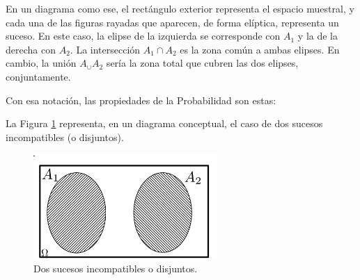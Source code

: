\begin{itemize}
En un diagrama como ese, el rectángulo exterior representa el espacio muestral, y cada una de las figuras rayadas que aparecen, de forma elíptica,  representa un suceso. En este caso, la elipse de la izquierda se corresponde con $A_1$ y la de la derecha con $A_2$. La intersección $A_1\cap A_2$ es la zona común a ambas elipses. En cambio, la unión $A_\cup A_2$ sería la zona total que cubren las dos elipses, conjuntamente.

\pagebreak
\hspace{-0.8cm}Con esa notación, las propiedades de la Probabilidad son estas:

\begin{center}
\end{center}
    \end{itemize}
La Figura \ref{Cap03:fig:DiagramaVennSucesosDisjuntos} representa, en un diagrama conceptual, el caso de dos sucesos incompatibles (o disjuntos).

\begin{figure}[htbp]
\begin{center}
\includegraphics[height=4cm]{../fig/Cap03-DiagramaVennSucesosDisjuntos.png}
	\caption{Dos sucesos incompatibles o disjuntos.}\label{Cap03:fig:DiagramaVennSucesosDisjuntos}
\end{center}
\end{figure}


